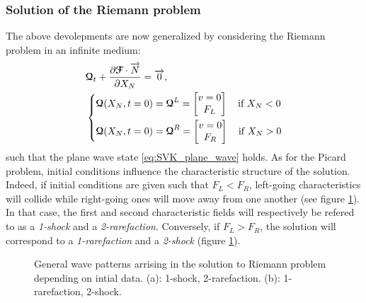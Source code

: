 \subsubsection*{Solution of the Riemann problem}
The above devolepments are now generalized by considering the Riemann problem in an infinite medium:
\begin{equation}
  \begin{aligned}
    &{\boldsymbol{\mathcal{Q}}}_t + \frac{\partial {\boldsymbol{\mathcal{F}}}\cdot {\overrightarrow{N}}}{\partial X_N} = {\overrightarrow{0}}, \\
    &\left\lbrace 
      \begin{aligned}
        & {\boldsymbol{\mathcal{Q}}}(X_N,t=0) = {\boldsymbol{\mathcal{Q}}}^L = \left[\begin{matrix}v=0 \\ F_L\end{matrix}\right] \quad \text{if } X_N< 0\\
        & {\boldsymbol{\mathcal{Q}}}(X_N,t=0) = {\boldsymbol{\mathcal{Q}}}^R = \left[\begin{matrix}v=0 \\ F_R\end{matrix}\right]\quad \text{if } X_N> 0
      \end{aligned}
    \right.
  \end{aligned}
\end{equation}
such that the plane wave state \eqref{eq:SVK_plane_wave} holds.
As for the Picard problem, initial conditions influence the characteristic structure of the solution. Indeed, if initial conditions are given such that $F_L<F_R$, left-going characteristics will collide while right-going ones will move away from one another (see figure \ref{fig:RP_solution}). In that case, the first and second characteristic fields will respectively be refered to as a \textit{1-shock} and a \textit{2-rarefaction}. Conversely, if $F_L>F_R$, the solution will correspond to a \textit{1-rarefaction} and a \textit{2-shock} (figure \ref{fig:RP_solution}). 

\begin{figure}[h]
  \centering
  \caption{General wave patterns arrising in the solution to Riemann problem depending on intial data. (a): 1-shock, 2-rarefaction. (b): 1-rarefaction, 2-shock.}
  \label{fig:RP_solution}
\end{figure}

